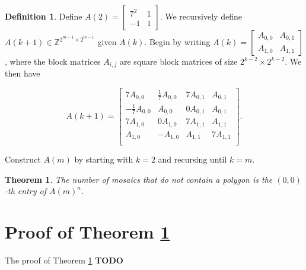 \documentclass[12pt]{article}
\theoremstyle{plain}
\newtheorem{thm}{Theorem}[section]
\theoremstyle{definition}
\newtheorem{definition}{Definition}[section]
\theoremstyle{remark}
\theoremstyle{definition}
\begin{document}
\begin{definition}

Define $A(2) = \begin{bmatrix}
7^2 & 1 \\
-1 & 1
\end{bmatrix}$. We recursively define $A(k+1) \in \mathbb{Z}^{2^{m-1} \times 2^{m-1}}$ given $A(k)$. Begin by writing
$
A(k) = \begin{bmatrix}
A_{0,0} & A_{0,1} \\
A_{1,0} & A_{1,1}
\end{bmatrix}
$, where the block matrices $A_{i,j}$ are square block matrices of size $2^{k-2} \times 2^{k-2}$. We then have

$$
A(k+1) = \begin{bmatrix}
    7A_{0,0} & \frac{1}{7}A_{0,0} & 7A_{0,1} & A_{0,1} \\
    -\frac{1}{7}A_{0,0} & A_{0,0} & 0A_{0,1} & A_{0,1} \\
    7A_{1,0} & 0A_{1,0} & 7A_{1,1}  & A_{1,1} \\
    A_{1,0} & -A_{1,0} & A_{1,1} & 7A_{1,1} \\
\end{bmatrix}.
$$

Construct $A(m)$ by starting with $k=2$ and recursing until $k=m$. 

\end{definition}

\begin{thm}
\label{thm: messy mosaics}
The number of mosaics that \textit{do not} contain a polygon is the $(0,0)$-th entry of $A(m)^n$.
\end{thm}

\section{Proof of Theorem \ref{thm: messy mosaics}}

The proof of Theorem \ref{thm: messy mosaics} \textbf{TODO}
\end{document}
